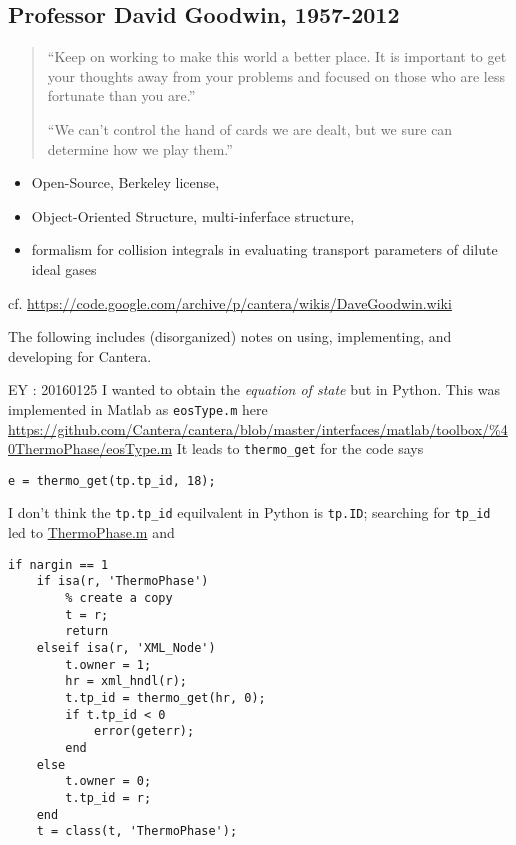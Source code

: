 \documentclass[10pt]{amsart}
\begin{document}
\begin{multicols*}{2}
\section{Professor David Goodwin, 1957-2012}

\begin{quotation}
``Keep on working to make this world a better place. It is important to get your thoughts away from your problems and focused on those who are less fortunate than you are.''

``We can't control the hand of cards we are dealt, but we sure can determine how we play them.''
\end{quotation}

\begin{itemize}
  \item Open-Source, Berkeley license,
  \item Object-Oriented Structure, multi-inferface structure, 
  \item formalism for collision integrals in evaluating transport parameters of dilute ideal gases
\end{itemize}

cf. \url{https://code.google.com/archive/p/cantera/wikis/DaveGoodwin.wiki}

The following includes (disorganized) notes on using, implementing, and developing for Cantera.  

EY : 20160125 I wanted to obtain the \emph{equation of state} but in Python.  This was implemented in Matlab as \verb|eosType.m| here
\url{https://github.com/Cantera/cantera/blob/master/interfaces/matlab/toolbox/%40ThermoPhase/eosType.m}
It leads to \verb|thermo_get| for the code says
\begin{lstlisting}
e = thermo_get(tp.tp_id, 18);
\end{lstlisting}
I don't think the \verb|tp.tp_id| equilvalent in Python is \verb|tp.ID|; searching for \verb|tp_id| led to \href{https://github.com/Cantera/cantera/blob/5926d2db7c0d4919b75ee50828b0adab4e691a51/interfaces/matlab/toolbox/%40ThermoPhase/ThermoPhase.m}{ThermoPhase.m} and 
\begin{lstlisting}
if nargin == 1
    if isa(r, 'ThermoPhase')
        % create a copy
        t = r;
        return
    elseif isa(r, 'XML_Node')
        t.owner = 1;
        hr = xml_hndl(r);
        t.tp_id = thermo_get(hr, 0);
        if t.tp_id < 0
            error(geterr);
        end
    else
        t.owner = 0;
        t.tp_id = r;
    end
    t = class(t, 'ThermoPhase');
\end{lstlisting}


\end{multicols*}
\end{document}
